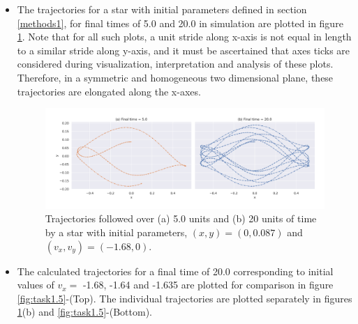 \documentclass[a4paper]{article}
\begin{document}
\begin{itemize}
			\item The trajectories for a star with initial parameters defined in section \ref{methods1}, for final times of 5.0 and 20.0 in simulation are plotted in figure \ref{fig:task1.4}. Note that for all such plots, a unit stride along x-axis is not equal in length to a similar stride along y-axis, and it must be ascertained that axes ticks are considered during visualization, interpretation and analysis of these plots. Therefore, in a symmetric and homogeneous two dimensional plane, these trajectories are elongated along the x-axes.
			
			\begin{figure} 
				\includegraphics[width=\columnwidth]{../task1/q4-trajectory/plots/q4.jpg}
				\caption{Trajectories followed over (a) 5.0 units and (b) 20 units of time by a star with initial parameters, \((x,y)=(0,0.087)\) and \((v_x,v_y)=(-1.68,0)\).}
				\label{fig:task1.4}
			\end{figure}
			
			\item The calculated trajectories for a final time of 20.0 corresponding to initial values of \(v_x = \) -1.68, -1.64 and -1.635 are plotted for comparison in figure \ref{fig:task1.5}-(Top). The individual trajectories are plotted separately in figures \ref{fig:task1.4}(b) and \ref{fig:task1.5}-(Bottom). 
			

\end{itemize}
\end{document}
